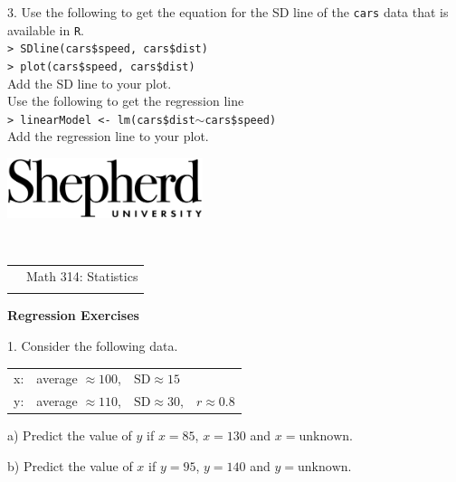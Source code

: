\documentclass[10pt]{article}
\begin{document}
{3. Use the following to get the equation for the SD line of the
   \texttt{cars} data that is available in \texttt{R}.\\
 \texttt{> SDline(cars\$speed, cars\$dist)}\\
 \texttt{> plot(cars\$speed, cars\$dist)}\\
 Add the SD line to your plot.\\
 Use the following to get the regression line\\
 \texttt{> linearModel <- lm(cars\$dist$\sim$cars\$speed)}\\
 Add the regression line to your plot.\\
\vfill
\eject

\href{http://www.shepherd.edu}{\includegraphics[height=1.75cm]{logo-high-res.eps}}
\vspace{-1.69cm}

{\small{\ }\hfill
\begin{tabular}{cl}
& Math 314:  Statistics\\
                & %
\end{tabular}
}
\medskip

\begin{center}
\textbf{\large Regression Exercises}
\end{center}
\medskip

1. Consider the following data.
\begin{center}
\begin{tabular}{llll}
x: & average $\approx 100$, & $\mbox{SD}\approx 15$\\
y: & average $\approx 110$, & $\mbox{SD}\approx 30$,  & $r\approx 0.8$\\
\end{tabular}
\end{center}

\hspace{20pt} a) Predict the value of $y$ if $x=85$, $x=130$ and $x=\mbox{unknown}$.
\vspace{1.5in}

\hspace{20pt} b) Predict the value of $x$ if $y=95$, $y=140$ and $y=\mbox{unknown}$.
\vspace{1.5in}

}
\end{document}
